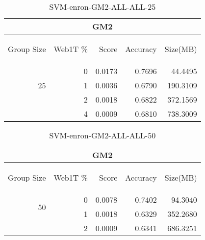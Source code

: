 \begin{center}
\begin{table}[htbp] 
 \begin{center}
\begin{tabular}{ | r | r | r | r | r |}
\hline
\multicolumn{5}{|c|}{GM2}\\
\hline
\begin{sideways}Group Size\end{sideways} & \begin{sideways}Web1T \%\end{sideways} & \begin{sideways}Score\end{sideways} & \begin{sideways}Accuracy\end{sideways} & \begin{sideways}Size(MB)\end{sideways}\\
\hline
\multirow{3}{*}{25}
 & 0 & 0.0173 & 0.7696 & 44.4495\\ \cline{2-5}
 & 1 & 0.0036 & 0.6790 & 190.3109\\ \cline{2-5}
 & 2 & 0.0018 & 0.6822 & 372.1569\\ \cline{2-5}
 & 4 & 0.0009 & 0.6810 & 738.3009\\ \cline{2-5}
\hline
\end{tabular}
\caption{SVM-enron-GM2-ALL-ALL-25}
\label{table:SVM-enron-GM2-ALL-ALL-25}
\end{center}
 \end{table}
\end{center}

\begin{center}
\begin{table}[htbp] 
 \begin{center}
\begin{tabular}{ | r | r | r | r | r |}
\hline
\multicolumn{5}{|c|}{GM2}\\
\hline
\begin{sideways}Group Size\end{sideways} & \begin{sideways}Web1T \%\end{sideways} & \begin{sideways}Score\end{sideways} & \begin{sideways}Accuracy\end{sideways} & \begin{sideways}Size(MB)\end{sideways}\\
\hline
\multirow{2}{*}{50}
 & 0 & 0.0078 & 0.7402 & 94.3040\\ \cline{2-5}
 & 1 & 0.0018 & 0.6329 & 352.2680\\ \cline{2-5}
 & 2 & 0.0009 & 0.6341 & 686.3251\\ \cline{2-5}
\hline
\end{tabular}
\caption{SVM-enron-GM2-ALL-ALL-50}
\label{table:SVM-enron-GM2-ALL-ALL-50}
\end{center}
 \end{table}
\end{center}

